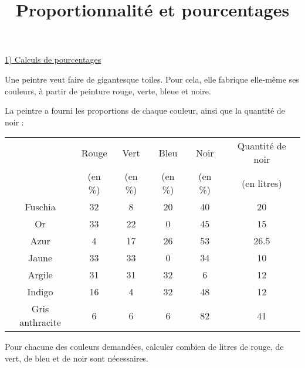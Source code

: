 \documentclass[
	a4paper,
	classe=1STI2D,
	headerTitle=Activité
]{exercice}
\title{Proportionnalité et pourcentages}
\begin{document}
\maketitle

{\large\uline{1) Calculs de pourcentages}}

Une peintre veut faire de gigantesque toiles. Pour cela, elle fabrique elle-même ses couleurs, à partir de peinture rouge, verte, bleue et noire.

La peintre a fourni les proportions de chaque couleur, ainsi que la quantité de noir :

\begin{center}
	\begin{tabular}{|c|c|c|c|c||c|}
		\hline
		                & Rouge   & Vert    & Bleu    & Noir    & Quantité de noir \\
		                & (en \%) & (en \%) & (en \%) & (en \%) & (en litres)      \\ \hline
		Fuschia         & 32      & 8       & 20      & 40      & 20               \\ \hline
		Or              & 33      & 22      & 0       & 45      & 15               \\ \hline
		Azur            & 4       & 17      & 26      & 53      & 26.5             \\ \hline
		Jaune           & 33      & 33      & 0       & 34      & 10               \\ \hline
		Argile          & 31      & 31      & 32      & 6       & 12               \\ \hline
		Indigo          & 16      & 4       & 32      & 48      & 12               \\ \hline
		Gris anthracite & 6       & 6       & 6       & 82      & 41               \\ \hline
	\end{tabular}
\end{center}

Pour chacune des couleurs demandées, calculer combien de litres de rouge, de vert, de bleu et de noir sont nécessaires.

\vspace{2em}
\end{document}

